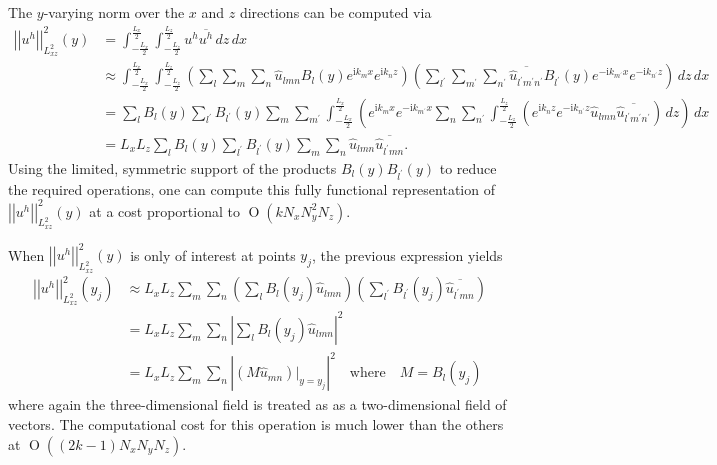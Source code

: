 \documentclass[letterpaper,11pt,nointlimits,reqno]{amsart}
\newcommand{\ii}{\ensuremath{\mathrm{i}}}
\newcommand{\OO}[1]{\operatorname{O}\left(#1\right)}
\begin{document}
The $y$-varying norm over the $x$ and $z$ directions can be computed via
\begin{align}
  \left|\left|
    u^h
  \right|\right|^{2}_{L^{2}_{xz}}
  \!(y)
&=
  \int_{-\frac{L_x}{2}}^{\frac{L_x}{2}}
  \int_{-\frac{L_z}{2}}^{\frac{L_z}{2}}
  u^h
  \overline{u^h}
  \,d\!z \,d\!x
\\ &\approx
  \int_{-\frac{L_x}{2}}^{\frac{L_x}{2}}
  \int_{-\frac{L_z}{2}}^{\frac{L_z}{2}}
  \left(
    \sum_{l}\sum_{m}\sum_{n}
    \hat{u}_{l m n}B_l\!\left(y\right)e^{\ii k_m x}e^{\ii k_n z}
  \right)
  \left(
    \sum_{l^\prime}\sum_{m^\prime}\sum_{n^\prime}
    \overline{\hat{u}_{l^\prime m^\prime n^\prime}}
    B_{l^\prime}\!\left(y\right)e^{-\ii k_{m^\prime} x}e^{-\ii k_{n^\prime} z}
  \right)
  \,d\!z \,d\!x
\\ &=
  \sum_{l}
  B_l\!\left(y\right)
  \sum_{l^\prime}
  B_{l^\prime}\!\left(y\right)
  \sum_{m}
  \sum_{m^\prime}
  \int_{-\frac{L_x}{2}}^{\frac{L_x}{2}}
  \left(
    e^{\ii k_m x}
    e^{-\ii k_{m^\prime} x}
    \sum_{n}
    \sum_{n^\prime}
    \int_{-\frac{L_z}{2}}^{\frac{L_z}{2}}
    \left(
      e^{\ii k_n z}
      e^{-\ii k_{n^\prime} z}
      \hat{u}_{l m n}
      \overline{\hat{u}_{l^\prime m^\prime n^\prime}}
    \right)
    \,d\!z
  \right)
  \,d\!x
\\ &=
  L_x L_z
  \sum_{l}
  B_l\!\left(y\right)
  \sum_{l^\prime}
  B_{l^\prime}\!\left(y\right)
  \sum_{m} \sum_{n} \hat{u}_{l m n} \overline{\hat{u}_{l^\prime m n}}
  .
\end{align}
Using the limited, symmetric support of the products $B_l\left(y\right)
B_{l^\prime}\left(y\right)$ to reduce the required operations, one can compute
this fully functional representation of $\left|\left| u^h
\right|\right|^{2}_{L^{2}_{xz}} \!(y)$ at a cost proportional to $\OO{k N_x
N_y^2 N_z}$.

When $\left|\left|u^h\right|\right|^{2}_{L^{2}_{xz}} \!(y)$ is
only of interest at points $y_j$, the previous expression yields
\begin{align}
  \left|\left|
    u^h
  \right|\right|^{2}_{L^{2}_{xz}}
  \!(y_j)
&\approx
  L_x L_z
  \sum_{m} \sum_{n}
  \left(
    \sum_{l}
    B_l\!\left(y_j\right)
    \hat{u}_{l m n}
  \right)
  \left(
    \sum_{l^\prime}
    B_{l^\prime}\!\left(y_j\right)
    \overline{\hat{u}_{l^\prime m n}}
  \right)
\\ &=
  L_x L_z
  \sum_{m} \sum_{n}
  \left|
    \sum_{l}
    B_l\!\left(y_j\right)
    \hat{u}_{l m n}
  \right|^{2}
\\ &=
  L_x L_z
  \sum_{m} \sum_{n}
  \left|
      \left(M \hat{u}_{m n}\right)\bigr|_{y=y_j}
  \right|^{2}
  \quad\text{where}\quad
  M = B_l\!\left(y_j\right)
\end{align}
where again the three-dimensional field is treated as as a two-dimensional
field of vectors.  The computational cost for this operation is much lower than
the others at $\OO{\left(2k-1\right) N_x N_y N_z}$.
\end{document}

